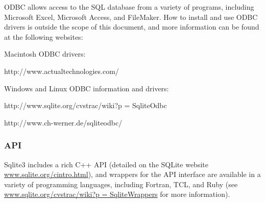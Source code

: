 ODBC allows access to the SQL database from a variety of programs, including Microsoft Excel, Microsoft Access, and FileMaker. How to install and use ODBC drivers is outside the scope of this document, and more information can be found at the following websites:

Macintosh ODBC drivers:

http://www.actualtechnologies.com/

Windows and Linux ODBC information and drivers:

http://www.sqlite.org/cvstrac/wiki?p = SqliteOdbc

http://www.ch-werner.de/sqliteodbc/

\subsubsection{API}\label{api}

Sqlite3 includes a rich C++ API (detailed on the SQLite website \href{http://www.sqlite.org/cintro.html}{www.sqlite.org/cintro.html}), and wrappers for the API interface are available in a variety of programming languages, including Fortran, TCL, and Ruby (see \href{http://www.sqlite.org/cvstrac/wiki?p\%20=\%20SqliteWrappers}{www.sqlite.org/cvstrac/wiki?p = SqliteWrappers} for more information).
